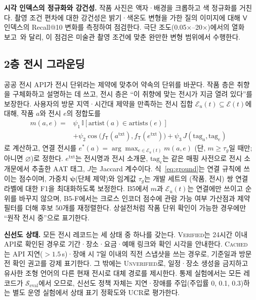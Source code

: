 \documentclass[10pt,twocolumn,letterpaper]{article}
\newcommand{\sT}{\mathsf{T}}
\newcommand{\sV}{\mathsf{V}}
\newcommand{\cE}{\mathcal{E}}
\newcommand{\cS}{\mathcal{S}}
\begin{document}
\textbf{시각 인덱스의 정규화와 강건성.} 작품 사진은 액자·배경을 크롭하고 색 정규화를 거친다. 촬영 조건 편차에 대한 강건성은 밝기·색온도 변형을 가한 질의 이미지에 대해 $\sV$ 인덱스의 Recall@10 변화를 측정하여 점검한다. 극단 조도(0.05×–20×)에서의 열화 보고~\cite{zhang2026eventmllm}와 달리, 이 점검은 미술관 촬영 조건에 맞춘 완만한 변형 범위에서 수행한다.

\subsection{2층 전시 그라운딩}
\label{sec:grounding}
공공 전시 API가 전시 단위라는 제약에 맞추어 약속의 단위를 바꾼다. 작품 층은 취향을 구체화하고 설명하는 데 쓰고, 전시 층은 ``이 취향에 맞는 전시가 지금 열려 있다''를 보장한다. 사용자의 방문 지역·시간대 제약을 만족하는 전시 집합 $\cE_u(t)\subseteq\cE(t)$에 대해, 작품 $a$와 전시 $e$의 정합도를
\begin{equation}
\begin{split}
m(a,e)={}&\psi_1\,\mathbb{I}[\mathrm{artist}(a)\in\mathrm{artists}(e)]\\
&+\psi_2\cos\bigl(f_\sT(a^{\mathrm{txt}}),f_\sT(e^{\mathrm{txt}})\bigr)+\psi_3\,J(\mathrm{tag}_a,\mathrm{tag}_e)
\end{split}
\label{eq:ground}
\end{equation}
로 계산하고, 연결 전시를 $e^\ast(a)=\arg\max_{e\in\cE_u(t)}m(a,e)$ (단, $m\ge\tau_g$일 때만; 아니면 $\varnothing$)로 정한다. $e^{\mathrm{txt}}$는 전시명과 전시 소개문, $\mathrm{tag}_e$는 같은 매핑 사전으로 전시 소개문에서 추출한 AAT 태그, $J$는 Jaccard 계수이다. 식~\eqref{eq:ground}는 연결 규칙에 쓰이는 점수이며, 가중치 $\bm{\psi}$(단체 제약)와 임계값 $\tau_g$는 개발 세트의 (작품, 전시) 쌍 연결 라벨에 대한 F1을 최대화하도록 보정한다. B5에서 $m$과 $\cE_u(t)$는 연결에만 쓰이고 순위를 바꾸지 않으며, B5-F에서는 크로스 인코더 점수에 관람 가능 여부 가산점과 제약 필터를 더해 후보 50개를 재정렬한다. 상설전처럼 작품 단위 확인이 가능한 경우에만 ``원작 전시 중''으로 표기한다.

\textbf{신선도 상태.} 모든 전시 레코드는 세 상태 중 하나를 갖는다. \textsc{Verified}는 24시간 이내 API로 확인된 경우로 기간·장소·요금·예매 링크와 확인 시각을 안내한다. \textsc{Cached}는 API 지연($>1.5$\,s)·장애 시 7일 이내의 직전 스냅샷을 쓰는 경우로, 기준일과 방문 전 확인 권고를 강제 표기한다. 그 밖에는 \textsc{Unverified}로, 일정·장소 생성을 금지하고 유사한 조형 언어의 다른 현재 전시로 대체 경로를 제시한다. 통제 실험에서는 모든 레코드가 $\cS_{\mathrm{eval}}$에서 오므로, 신선도 정책 자체는 지연·장애를 주입(주입률 0, 0.1, 0.3)하는 별도 운영 실험에서 상태 표기 정확도와 UCR로 평가한다.
\end{document}
